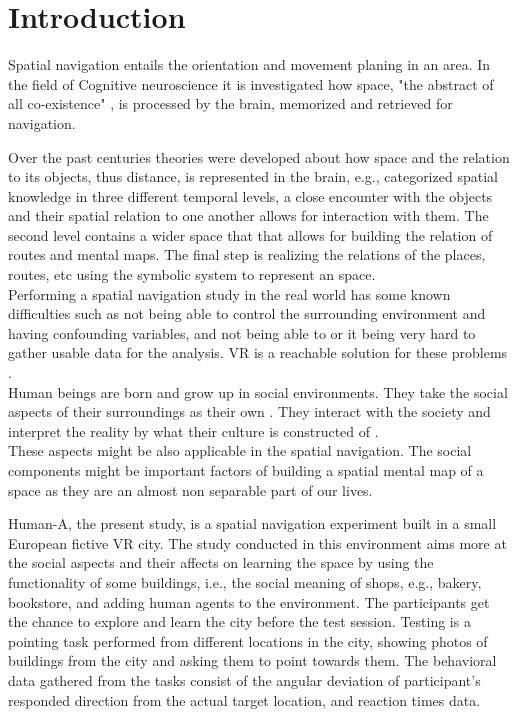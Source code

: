 \chapter{Introduction}

Spatial navigation entails the orientation and movement planing in an area. In the field of Cognitive neuroscience it is investigated how space, "the abstract of all co-existence" \autocite{spencer1989}, is processed by the brain, memorized and retrieved for navigation. 

Over the past centuries theories were developed about how space and the relation to its objects, thus distance, is represented in the brain, e.g., \textcite{cassirer1955philosophy} categorized spatial knowledge in three different temporal levels, a close encounter with the objects and their spatial relation to one another allows for interaction with them. The second level contains a wider space that that allows for building the relation of routes and mental maps. The final step is realizing the relations of the places, routes, etc using the symbolic system to represent an space. \\

Performing a spatial navigation study in the real world has some known difficulties such as not being able to control the surrounding environment and having confounding variables, and not being able to or it being very hard to gather usable data for the analysis. VR is a reachable solution for these problems . \\

Human beings are born and grow up in social environments. They take the social aspects of their surroundings as their own . They interact with the society and interpret the reality by what their culture is constructed of \autocite{SIEGEL19759}.\\

These aspects might be also applicable in the spatial navigation. The social components might be important factors of building a spatial mental map of a space as they are an almost non separable part of our lives. 

Human-A, the present study, is a spatial navigation experiment built in a small European fictive VR city. The study conducted in this environment aims more at the social aspects and their affects on learning the space by using the functionality of some buildings, i.e., the social meaning of shops, e.g., bakery, bookstore, and adding human agents to the environment. The participants get the chance to explore and learn the city before the test session. Testing is a pointing task performed from different locations in the city, showing photos of buildings from the city and asking them to point towards them. The behavioral data gathered from the tasks consist of the angular deviation of participant's responded direction from the actual target location, and reaction times data.\\

